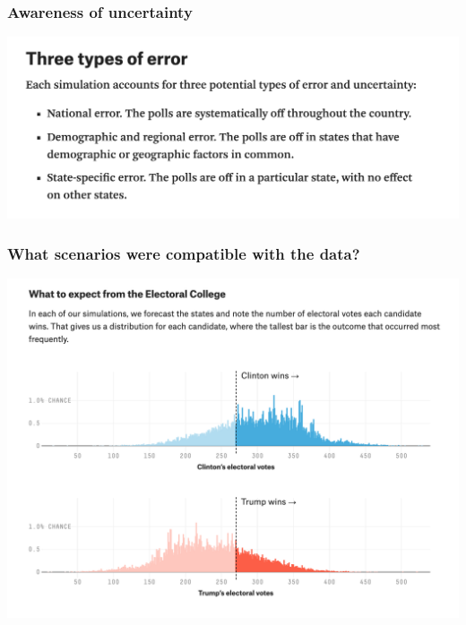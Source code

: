 \documentclass[aspectratio=169]{beamer}
\theoremstyle{principle}
\begin{document}
\begin{frame}
\frametitle{Awareness of uncertainty}
\begin{center}
\includegraphics[scale=0.6]{538-errors.png}
\end{center}

\end{frame}

\begin{frame}
\frametitle{What scenarios were compatible with the data?}
\begin{center}
\includegraphics[scale=0.3]{ec-scenarios.png}
\end{center}

\end{frame}
\end{document}
